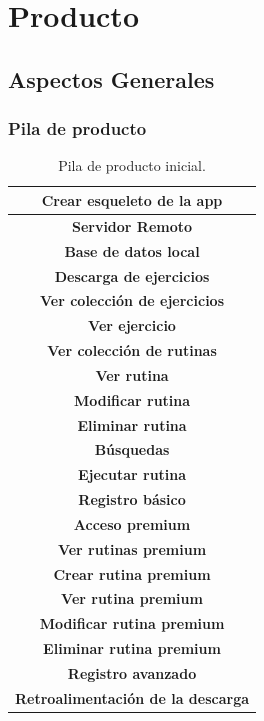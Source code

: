 \documentclass[11pt,a4paper]{report}
\begin{document}
\chapter{Producto}
\section{Aspectos Generales}
\subsection{Pila de producto}
\begin{table}[H]
	\centering
	\label{tab1}
	\begin{tabular}{|c|}
		\hline
		\rowcolor[HTML]{BBDAFF}
		\textbf{Crear esqueleto de la app}  \\ \hline
		\rowcolor[HTML]{BBDAFF}
		\textbf{Servidor Remoto}  \\ \hline
		\rowcolor[HTML]{BBDAFF}
		\textbf{Base de datos local}  \\ \hline
		\rowcolor[HTML]{BBDAFF}
		\textbf{Descarga de ejercicios}  \\ \hline
		\rowcolor[HTML]{BBDAFF}
		\textbf{Ver colección de ejercicios}  \\ \hline
		\rowcolor[HTML]{BBDAFF}
		\textbf{Ver ejercicio}  \\ \hline
		\rowcolor[HTML]{BBDAFF}
		\textbf{Ver colección de rutinas}  \\ \hline
		\rowcolor[HTML]{BBDAFF}
		\textbf{Ver rutina}  \\ \hline
		\rowcolor[HTML]{BBDAFF}
		\textbf{Modificar rutina}  \\ \hline
		\rowcolor[HTML]{BBDAFF}
		\textbf{Eliminar rutina}  \\ \hline
		\rowcolor[HTML]{9AFF99}
		\textbf{Búsquedas}  \\ \hline
		\rowcolor[HTML]{9AFF99}
		\textbf{Ejecutar rutina}  \\ \hline
		\rowcolor[HTML]{9AFF99}
		\textbf{Registro básico}  \\ \hline
		\rowcolor[HTML]{9AFF99}
		\textbf{Acceso premium}  \\ \hline
		\rowcolor[HTML]{9AFF99}
		\textbf{Ver rutinas premium}  \\ \hline
		\rowcolor[HTML]{9AFF99}
		\textbf{Crear rutina premium}  \\ \hline
		\rowcolor[HTML]{9AFF99}
		\textbf{Ver rutina premium}  \\ \hline
		\rowcolor[HTML]{9AFF99}
		\textbf{Modificar rutina premium}  \\ \hline
		\rowcolor[HTML]{9AFF99}
		\textbf{Eliminar rutina premium}  \\ \hline
		\rowcolor[HTML]{9AFF99}
		\textbf{Registro avanzado}  \\ \hline
		\rowcolor[HTML]{9AFF99}
		\textbf{Retroalimentación de la descarga}  \\ \hline
	\end{tabular}
	\caption{Pila de producto inicial.}         
\end{table}
\end{document}
